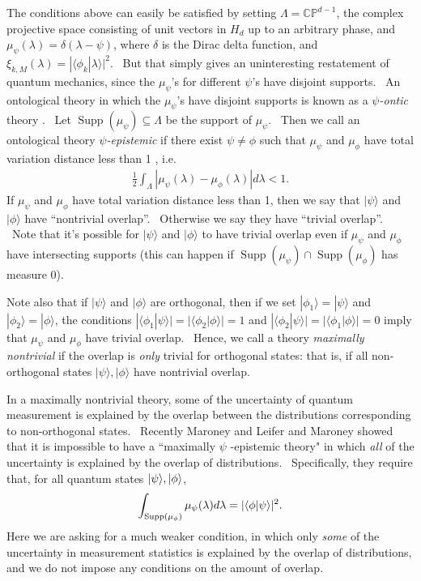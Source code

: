 \documentclass[letterpaper,11pt]{article}
\newcommand{\ba}{\begin{eqnarray}}
\newcommand{\ea}{\end{eqnarray}}
\newcommand{\braket}[2]{\mbox{$ \langle #1 | #2 \rangle $}}
\newcommand{\ket}[1]{\mbox{$ | #1 \rangle $}}
\DeclareMathOperator{\supp}{Supp}
\begin{document}
The conditions above can easily be satisfied by setting $\Lambda = \mathbb{CP}^{d-1}$, the complex projective space consisting of unit vectors in $H_d$ up to an arbitrary phase, and $%
\mu_\psi(\lambda) = \delta(\lambda-\psi)$, where $\delta$ is the Dirac delta
function, and $\xi_{k,M}(\lambda) = | \langle \phi_k | \lambda
\rangle |^2$. \ But that simply gives an uninteresting restatement of
quantum mechanics, since the $\mu_{\psi}$'s for different $\psi$'s have disjoint supports. \ An ontological
theory in which the $\mu_{\psi}$'s have disjoint supports is known as a \textit{$\psi$-ontic} theory \cite{harriganspekkens}. \ Let $\supp(\mu_{\psi})\subseteq\Lambda$ be the
support of $\mu_{\psi}$. \ Then we call an ontological theory \textit{$\psi$-epistemic} if there exist $\psi\neq\phi$ such that $\mu_\psi$ and $\mu_\phi$
have total variation distance less than 1 \cite{harriganspekkens}, i.e.
\begin{eqnarray}
\frac{1}{2}\int_{\Lambda}\left|\mu_{\psi}(\lambda)-\mu_{\phi}(\lambda)%
\right| d\lambda < 1.
\end{eqnarray}
If $\mu_\psi$ and $\mu_\phi$ have total variation distance less than 1, then
we say that $ | \psi \rangle $ and $ | \phi \rangle $ have
``nontrivial overlap''. \ Otherwise we say they have ``trivial overlap''. \
Note that it's possible for $ | \psi \rangle $ and $ | \phi
\rangle $ to have trivial overlap even if $\mu_\psi$ and $\mu_\phi$ have
intersecting supports (this can happen if $\supp(\mu_{\psi})\cap \supp%
(\mu_{\phi})$ has measure $0$).

Note also that if $ | \psi \rangle $ and $ | \phi \rangle $
are orthogonal, then if we set $ | \phi_1 \rangle  =  | \psi
\rangle $ and $ | \phi_2 \rangle  = | \phi \rangle $,
the conditions $| \langle \phi_1 | \psi \rangle |=| \langle
\phi_2 | \phi \rangle |=1$ and $| \langle \phi_2 | \psi \rangle %
|=| \langle \phi_1 | \phi \rangle |=0$ imply that $\mu_\psi$ and $%
\mu_\phi$ have trivial overlap. \ Hence, we call a theory \textit{%
maximally nontrivial} if the overlap is \emph{only} trivial for orthogonal states: that is, if all non-orthogonal states $%
 | \psi \rangle, | \phi \rangle $ have nontrivial
overlap.

In a maximally nontrivial theory, some of the uncertainty of quantum
measurement is explained by the overlap between the distributions
corresponding to non-orthogonal states. \ Recently Maroney \cite{mar} and
Leifer and Maroney \cite{marleif} showed that it is impossible to have a ``maximally $\psi$%
-epistemic theory" in which \emph{all} of the uncertainty is explained by
the overlap of distributions. \ Specifically, they require that, for all quantum states $\ket{\psi}, \ket{\phi}$,
\ba \int_{\supp(\mu_{\phi})} \mu_{\psi}(\lambda) d\lambda = |\braket{\phi}{\psi}|^2.\ea
Here we are asking for a much weaker
condition, in which only \emph{some} of the uncertainty in measurement
statistics is explained by the overlap of distributions, and we do not impose any conditions on the amount of overlap.
\end{document}
